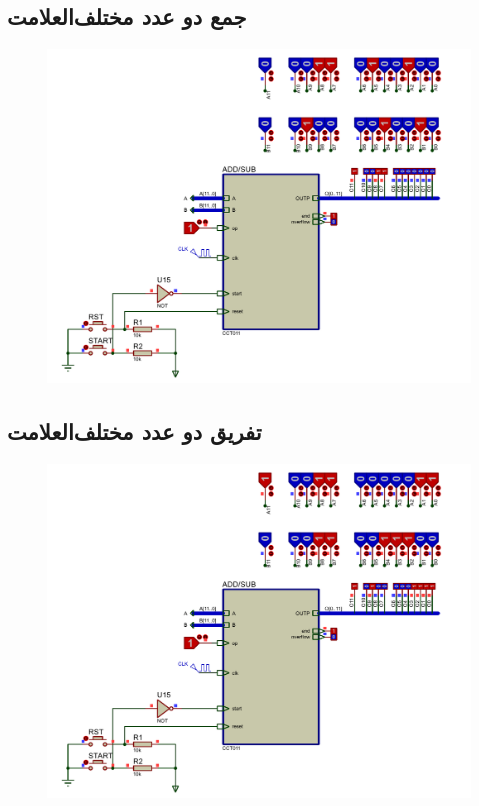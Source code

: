 \documentclass{article}
\begin{document}
\subsection{جمع دو عدد مختلف‌العلامت}
\begin{figure}[H]
	\centering
	\includegraphics[scale=0.5]{./graphics/tests/PosMinusPosNotEqual}
\end{figure}


\subsection{تفریق دو عدد مختلف‌العلامت}
\begin{figure}[H]
	\centering
	\includegraphics[scale=0.5]{./graphics/tests/subtraction_two_dirrefent_sign_numbers}
\end{figure}
\end{document}
